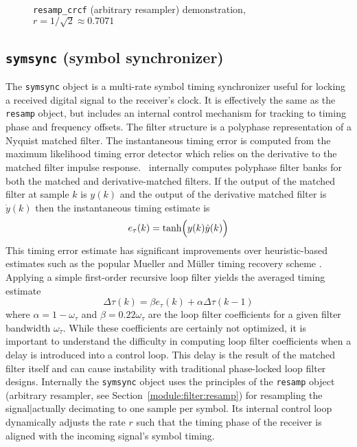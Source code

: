 \begin{figure}
\centering
{}
\caption{
    {\tt resamp\_crcf} (arbitrary resampler) demonstration,
    $r = 1/\sqrt{2} \approx 0.7071$}
\label{fig:module:filter:resamp_crcf}
\end{figure}


% 
%
\subsection{{\tt symsync} (symbol synchronizer)}
\label{module:filter:symsync}
The {\tt symsync} object is a multi-rate symbol timing synchronizer
useful for locking a received digital signal to the receiver's clock.
It is effectively the same as the {\tt resamp} object, but includes an
internal control mechanism for tracking to timing phase and frequency
offsets.
The filter structure is a polyphase representation of a Nyquist matched
filter.
%
The instantaneous timing error is computed from the maximum likelihood
timing error detector \cite{Mengali:1997} which relies on the derivative
to the matched filter impulse response.
\liquid\ internally computes polyphase filter banks for both the
matched and derivative-matched filters.
If the output of the matched filter at sample $k$ is $y(k)$
and the output of the derivative matched filter is $\dot{y}(k)$
then the instantaneous timing estimate is
%
\begin{equation}
\label{eqn:filter:symsync:timing_error}
    e_\tau(k) = \tanh\Bigl( y(k)\dot{y}(k) \Bigr)
\end{equation}
%
This timing error estimate has significant improvements over
heuristic-based estimates such as the popular Mueller and M\"{u}ller
timing recovery scheme \cite{Mueller:1976}. %
Applying a simple first-order recursive loop filter yields the averaged
timing estimate
%
\begin{equation}
\label{eqn:filter:symsync:timing_error_filtered}
    \Delta\tau(k) = \beta e_\tau(k) + \alpha\Delta\tau(k-1)
\end{equation}
%
where
$\alpha = 1-\omega_\tau$ and $\beta = 0.22\omega_\tau$
are the loop filter coefficients for a given filter bandwidth
$\omega_\tau$.
While these coefficients are certainly not optimized,
it is important to understand the difficulty in computing loop filter
coefficients when a delay is introduced into a control loop.
This delay is the result of the matched filter itself and can cause
instability with traditional phase-locked loop filter designs.
%
Internally the {\tt symsync} object uses the principles of the
{\tt resamp} object
(arbitrary resampler, see Section~\ref{module:filter:resamp})
for resampling the signal|actually decimating to one sample per symbol.
Its internal control loop dynamically adjusts the rate $r$ such that
the timing phase of the receiver is aligned with the incoming signal's
symbol timing.

